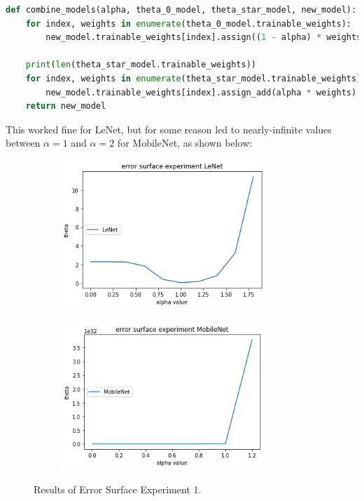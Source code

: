 \documentclass{article}
\begin{document}
\begin{lstlisting}[language=Python]
def combine_models(alpha, theta_0_model, theta_star_model, new_model):
    for index, weights in enumerate(theta_0_model.trainable_weights):
        new_model.trainable_weights[index].assign((1 - alpha) * weights)

    print(len(theta_star_model.trainable_weights))
    for index, weights in enumerate(theta_star_model.trainable_weights):
        new_model.trainable_weights[index].assign_add(alpha * weights)
    return new_model
\end{lstlisting}

This worked fine for LeNet, but for some reason led to nearly-infinite values between $\alpha = 1$ and $\alpha = 2$ for MobileNet, as shown below:

\begin{figure}[H]
\centering
\begin{subfigure}
  \centering
  \includegraphics[width=3in]{csci-8920/hw-3/images/theta_lenet.png}
  \label{fig:ln-2}
\end{subfigure}%
\begin{subfigure}
  \centering
  \includegraphics[width=3in]{csci-8920/hw-3/images/theta_mobilenet.png}
  \label{fig:mn-2}
\end{subfigure}
\caption{Results of Error Surface Experiment 1.}
\label{fig:default-15}
\end{figure}
\end{document}
